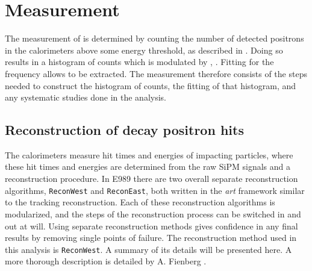 
\thispagestyle{myheadings}

\graphicspath{{Body/Figures/Wa/Temporary/}{Body/Figures/Wa/Temporary/FitResiduals/}{Body/Figures/Wa/Reconstruction/}{Body/Figures/Wa/Histogramming/}{Body/Figures/Wa/Pileup/}{Body/Figures/Wa/Pileup/TimeAndEnergySpectra/}{Body/Figures/Wa/Pileup/Scaling/}{Body/Figures/Wa/RatioAnalysis/}{Body/Figures/Wa/RatioAnalysis/MethodOverview/}{Body/Figures/Wa/RatioAnalysis/VW_Studies/}{Body/Figures/Wa/Datasets/9d/EnergyThreshold/}{Body/Figures/Wa/Datasets/Endgame/LostMuonFiles/MainCuts/}{Body/Figures/Wa/Datasets/ComparisonPlots/LostMuons/}{Body/Figures/Wa/Datasets/60h/SingleIteration/SingleFits/}{Body/Figures/Wa/Datasets/9d/SingleIteration/LostMuonFits/}{Body/Figures/Wa/Datasets/9d/PileupJobs/PileupGapTime/}{Body/Figures/Wa/Datasets/9d/PileupJobs/PileupDeadTime/auto-scaling/}{Body/Figures/Wa/Datasets/9d/PileupJobs/PileupDeadTime/fixed-scaling/}{Body/Figures/Wa/Datasets/9d/PileupJobs/PileupEnergyScale/}{Body/Figures/Wa/Datasets/9d/PileupJobs/PileupTimeShift/}{Body/Figures/Wa/Datasets/9d/SingleIteration/PileupMultiplierScan/}}

\chapter{\texorpdfstring{\wa}{wa} Measurement}
\label{chapter:wa}


The measurement of \wa is determined by counting the number of detected positrons in the calorimeters above some energy threshold, as described in . Doing so results in a histogram of counts which is modulated by \wa, . Fitting for the frequency allows \wa to be extracted. The \wa measurement therefore consists of the steps needed to construct the histogram of counts, the fitting of that histogram, and any systematic studies done in the analysis. 


\section{Reconstruction of decay positron hits}
\label{sec:ReconWest}


The calorimeters measure hit times and energies of impacting particles, where these hit times and energies are determined from the raw SiPM signals and a reconstruction procedure. In E989 there are two overall separate reconstruction algorithms, \texttt{ReconWest} and \texttt{ReconEast}, both written in the \textit{art} framework similar to the tracking reconstruction. Each of these reconstruction algorithms is modularized, and the steps of the reconstruction process can be switched in and out at will. Using separate reconstruction methods gives confidence in any final results by removing single points of failure. The reconstruction method used in this analysis is \texttt{ReconWest}. A summary of its details will be presented here. A more thorough description is detailed by A. Fienberg \cite{AFThesis}.


